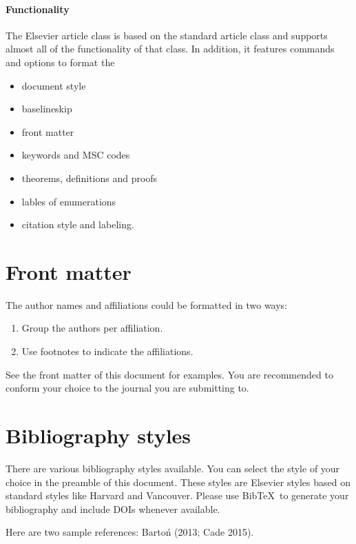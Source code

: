 \documentclass[]{elsarticle} %
\begin{document}
\paragraph{Functionality}\label{functionality}

The Elsevier article class is based on the standard article class and
supports almost all of the functionality of that class. In addition, it
features commands and options to format the

\begin{itemize}
\item
  document style
\item
  baselineskip
\item
  front matter
\item
  keywords and MSC codes
\item
  theorems, definitions and proofs
\item
  lables of enumerations
\item
  citation style and labeling.
\end{itemize}

\section{Front matter}\label{front-matter}

The author names and affiliations could be formatted in two ways:

\begin{enumerate}
\def\labelenumi{(\arabic{enumi})}
\item
  Group the authors per affiliation.
\item
  Use footnotes to indicate the affiliations.
\end{enumerate}

See the front matter of this document for examples. You are recommended
to conform your choice to the journal you are submitting to.

\section{Bibliography styles}\label{bibliography-styles}

There are various bibliography styles available. You can select the
style of your choice in the preamble of this document. These styles are
Elsevier styles based on standard styles like Harvard and Vancouver.
Please use BibTeX~to generate your bibliography and include DOIs
whenever available.

Here are two sample references: Barto{ń} (2013; Cade 2015).
\end{document}
